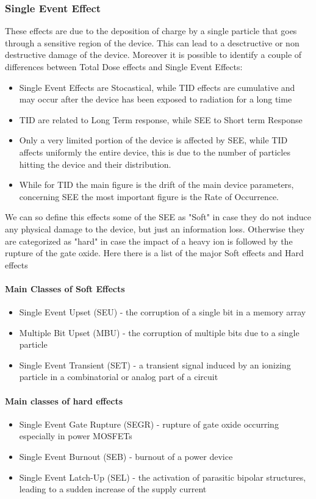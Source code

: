 \documentclass[./dissertation.tex]{subfiles}
\begin{document}
\subsubsection{Single Event Effect}
These effects are due to the deposition of charge by a single particle that goes through a sensitive region of the device. This can lead to a desctructive or non destructive damage of the device.
Moreover it is possible to identify a couple of differences between Total Dose effects and Single Event Effects:
\begin{itemize}
    \item Single Event Effects are Stocastical, while TID effects are cumulative and may occur after the device has been exposed to radiation for a long time
    \item TID are related to Long Term response, while SEE to Short term Response
    \item Only a very limited portion of the device is affected by SEE, while TID affects uniformly the entire device, this is due to the number of particles hitting the device and their distribution.
    \item While for TID the main figure is the drift of the main device parameters, concerning SEE the most important figure is the Rate of Occurrence.
\end{itemize}

We can so define this effects some of the SEE as "Soft" in case they do not induce any physical damage to the device, but just an information loss. Otherwise they are categorized as "hard" in case the impact of a heavy ion is followed by the rupture of the gate oxide. Here there is a list of the major Soft effects and Hard effects
\paragraph{Main Classes of Soft Effects}
\begin{itemize}
    \item Single Event Upset (SEU) - the corruption of a single bit in a memory array
    \item Multiple Bit Upset (MBU) - the corruption of multiple bits due to a single particle
    \item Single Event Transient (SET) - a transient signal induced by an ionizing particle in a combinatorial or analog part of a circuit
\end{itemize}
\paragraph{Main classes of hard effects}
\begin{itemize}
    \item Single Event Gate Rupture (SEGR) - rupture of gate oxide occurring especially in power MOSFETs
    \item Single Event Burnout (SEB) - burnout of a power device
    \item Single Event Latch-Up (SEL) - the activation of parasitic bipolar structures, leading to a sudden increase of the supply current
\end{itemize}
\end{document}
